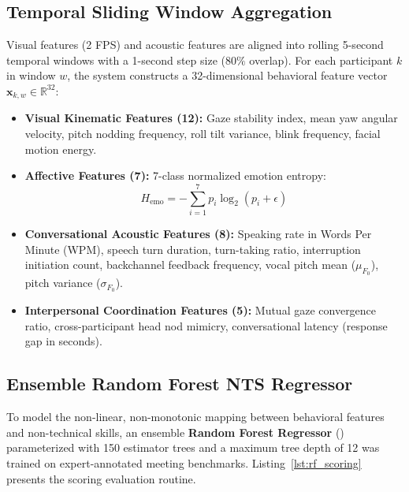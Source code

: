 \documentclass[12pt,a4paper,oneside]{report}
\providecommand{\parencite}[1]{(\cite{#1})}
\begin{document}
\subsection{Temporal Sliding Window Aggregation}
Visual features (2 FPS) and acoustic features are aligned into rolling 5-second temporal windows with a 1-second step size ($80\%$ overlap). For each participant $k$ in window $w$, the system constructs a 32-dimensional behavioral feature vector $\mathbf{x}_{k,w} \in \mathbb{R}^{32}$:
\begin{itemize}
    \item \textbf{Visual Kinematic Features (12):} Gaze stability index, mean yaw angular velocity, pitch nodding frequency, roll tilt variance, blink frequency, facial motion energy.
    \item \textbf{Affective Features (7):} 7-class normalized emotion entropy:
    \begin{equation}
        H_{\text{emo}} = -\sum_{i=1}^7 p_i \log_2(p_i + \epsilon)
    \end{equation}
    \item \textbf{Conversational Acoustic Features (8):} Speaking rate in Words Per Minute (WPM), speech turn duration, turn-taking ratio, interruption initiation count, backchannel feedback frequency, vocal pitch mean ($\mu_{F_0}$), pitch variance ($\sigma_{F_0}$).
    \item \textbf{Interpersonal Coordination Features (5):} Mutual gaze convergence ratio, cross-participant head nod mimicry, conversational latency (response gap in seconds).
\end{itemize}

\subsection{Ensemble Random Forest NTS Regressor}
To model the non-linear, non-monotonic mapping between behavioral features and non-technical skills, an ensemble \textbf{Random Forest Regressor} \parencite{breiman2001random, pedregosa2011scikit} parameterized with 150 estimator trees and a maximum tree depth of 12 was trained on expert-annotated meeting benchmarks. Listing~\ref{lst:rf_scoring} presents the scoring evaluation routine.
\end{document}
